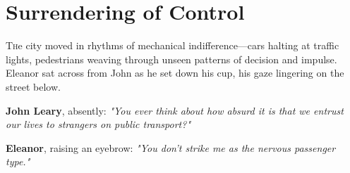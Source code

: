 % 
% 
% 
% 
% 
% 
% 
% 
\section*{Surrendering of Control}

\lettrine{T}he city moved in rhythms of mechanical indifference—cars halting at traffic lights, pedestrians weaving through unseen patterns of decision and impulse. Eleanor sat across from John as he set down his cup, his gaze lingering on the street below.

\bigskip

\textbf{John Leary}, absently: \textit{"You ever think about how absurd it is that we entrust our lives to strangers on public transport?"}

\bigskip

\textbf{Eleanor}, raising an eyebrow: \textit{"You don’t strike me as the nervous passenger type."}

\bigskip

